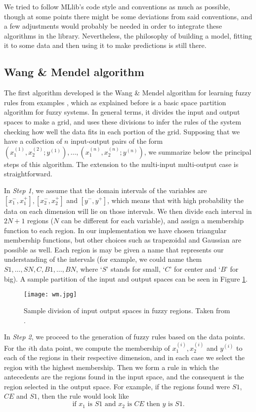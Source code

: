 We tried to follow MLlib's code style and conventions as much as possible, though at some points there might be some deviations from said conventions, and a few adjustments would probably be needed in order to integrate these algorithms in the library. Nevertheless, the philosophy of building a model, fitting it to some data and then using it to make predictions is still there.

\subsection{Wang \& Mendel algorithm}

The first algorithm developed is the Wang \& Mendel algorithm for learning fuzzy rules from examples \cite{wang1992generating}, which as explained before is a basic space partition algorithm for fuzzy systems. In general terms, it divides the input and output spaces to make a grid, and uses these divisions to infer the rules of the system checking how well the data fits in each portion of the grid. Supposing that we have a collection of $n$ input-output pairs of the form $(x_1^{(1)}, x_2^{(2)}; y^{(1)}),\dots, (x_1^{(n)}, x_2^{(n)}; y^{(n)})$, we summarize below the principal steps of this algorithm. The extension to the multi-input multi-output case is straightforward.

In \textit{Step 1}, we assume that the domain intervals of the variables are $[x_1^-,x_1^+], [x_2^-,x_2^+]$ and $[y^-,y^+]$, which means that with high probability the data on each dimension will lie on those intervals. We then divide each interval in $2N+1$ regions ($N$ can be different for each variable), and assign a membership function to each region. In our implementation we have chosen triangular membership functions, but other choices such as trapezoidal and Gaussian are possible as well. Each region is may be given a name that represents our understanding of the intervals (for example, we could name them $S1,\dots, SN, C, B1, \dots, BN$, where `$S$' stands for small, `$C$' for center and `$B$' for big). A sample partition of the input and output spaces can be seen in Figure \ref{fig:wm}.

\begin{figure}[h!]
\centering
\texttt{[image: wm.jpg]}
\caption{Sample division of input output spaces in fuzzy regions. Taken from \cite{wang1992generating}.}
\label{fig:wm}
\end{figure}

In \textit{Step 2}, we proceed to the generation of fuzzy rules based on the data points. For the $i$th data point, we compute the membership of $x_1^{(i)},x_2^{(i)}$ and $y^{(i)}$ to each of the regions in their respective dimension, and in each case we select the region with the highest membership. Then we form a rule in which the antecedents are the regions found in the input space, and the consequent is the region selected in the output space. For example, if the regions found were $S1$, $CE$ and $S1$, then the rule would look like
\begin{equation}\label{eq:rule}
  \text{if $x_1$ is $S1$ and $x_2$ is $CE$ then $y$ is $S1$}.
\end{equation}

